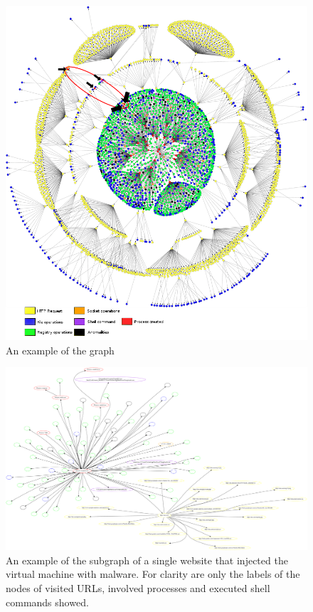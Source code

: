 \begin{figure}[h]
    \centering
    \centerline{\includegraphics[width=20cm]{Images/graph4.jpg}}
    \caption{An example of the graph}
    \label{fig:graph}
\end{figure}

\begin{figure}[h]
    \centering
    \includegraphics[width=25cm, angle=90]{Images/report_Subprocess_from_tab}
    \caption{An example of the subgraph of a single website that injected the virtual machine with malware. For clarity are only the labels of the nodes of visited URLs, involved processes and executed shell commands showed.}
    \label{fig:subgraph}
\end{figure}

